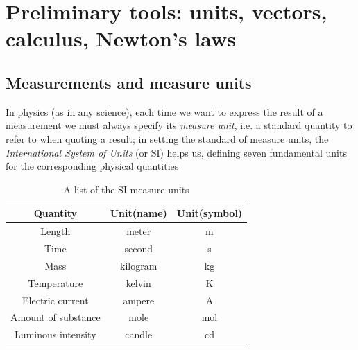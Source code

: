 \chapter{Preliminary tools: units, vectors, calculus, Newton's laws}

\section{Measurements and measure units}
In physics (as in any science), each time we want to express the result of a measurement we must always specify its \textit{measure unit}, i.e. a standard quantity to refer to when quoting a result; in setting the standard of measure units, the \textit{International System of Units} (or SI) helps us, defining seven fundamental units for the corresponding physical quantities

\begin{table}[htbp]
\begin{center}
\begin{tabular}{|c|c|c|} \hline
\textbf{Quantity} & \textbf{Unit(name)} & \textbf{Unit(symbol)} \\ \hline
Length & meter & m \\ \hline
Time & second & s \\ \hline
Mass & kilogram & kg \\ \hline
Temperature & kelvin & K \\ \hline
Electric current & ampere & A \\ \hline
Amount of substance & mole & mol \\ \hline
Luminous intensity & candle & cd \\ \hline
\end{tabular}
\end{center}
\caption{A list of the SI measure units}
\end{table}

